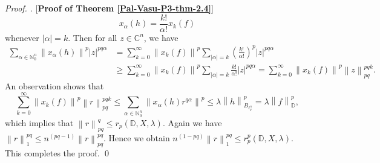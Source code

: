 \documentclass[a4paper,12pt]{amsart}
\theoremstyle{definition}
\newenvironment{pf}[1][]{%
 \vskip 3mm
 \noindent
 \ifthenelse{\equal{#1}{}}%
  {{\slshape Proof. }}%
  {{\slshape #1.} }%
 }%
{\qed\bigskip}
\newcommand{\norm}[1]{\left\lVert#1\right\rVert}
\begin{document}
\begin{pf} [{\bf Proof of Theorem \ref{Pal-Vasu-P3-thm-2.4}}]
\begin{equation*}
		x_{\alpha}(h)=\frac{k!}{\alpha!}x_k(f)
	\end{equation*}
	whenever $|\alpha|=k$. Then for all $z\in \mathbb{C}^n$, we have
	\begin{align*}
		\sum_{\alpha\in \mathbb{N}^n_{0}}\norm{x_{\alpha}(h)}^p|z|^{pq\alpha}&= \sum_{k=0}^{\infty}\norm{x_k(f)}^p\sum_{|\alpha|=k}\left(\frac{k!}{\alpha!}\right)^p|z|^{pq\alpha}\\[2mm]& \geq \sum_{k=0}^{\infty} \norm{x_k(f)}^p\sum_{|\alpha|=k}\frac{k!}{\alpha!}|z|^{pq\alpha} =\sum_{k=0}^{\infty}\norm{x_k(f)}^p\norm{z}^{pqk}_{pq}.
	\end{align*}
	An observation shows that
	\begin{equation*}
		\sum_{k=0}^{\infty}\norm{x_k(f)}^p\norm{r}^{pqk}_{pq}\leq \sum_{\alpha\in \mathbb{N}^n_{0}}\norm{x_{\alpha}(h)r^{q\alpha}}^p \leq \lambda \norm{h}^p_{B_{\ell^n_{q}}}=\lambda\norm{f}^p_{\mathbb{D}},
	\end{equation*}
	which implies that $\norm{r}^q_{pq}\leq r_p(\mathbb{D},X,\lambda).$ Again we have $\norm{r}^{pq}_{1}\leq n^{(pq-1)}\norm{r}^{pq}_{pq}.$ Hence we obtain $n^{(1-pq)}\norm{r}^{pq}_{1}\leq r^p_p(\mathbb{D},X,\lambda)$. This completes the proof.
\end{pf}
\end{document}
